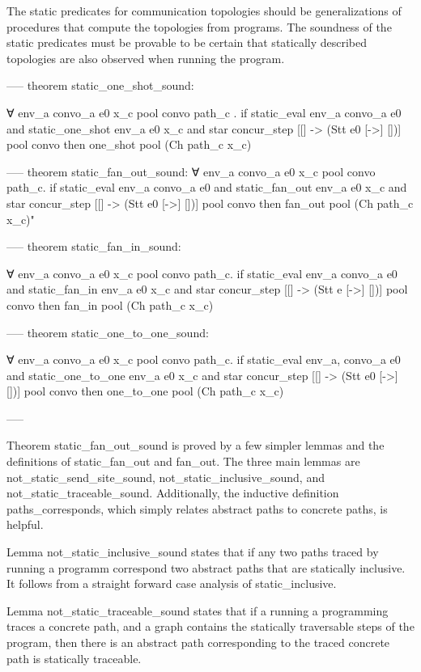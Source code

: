 The static predicates for communication topologies should be generalizations of procedures that
compute the topologies from programs.  The soundness of the static predicates must be provable
to be certain that statically described topologies are also observed when running the program.

-----
theorem static_one_shot_sound: 

∀ env_a convo_a e0 x_c pool convo path_c .
if
  static_eval env_a convo_a e0 and 
  static_one_shot env_a e0 x_c and 
  star concur_step [[] -> (Stt e0 [->] [])] {} pool convo
then
  one_shot pool (Ch path_c x_c)

-----
theorem static_fan_out_sound:
∀ env_a convo_a e0 x_c pool convo path_c. 
  if 
    static_eval env_a convo_a e0 and 
    static_fan_out env_a e0 x_c and 
    star concur_step [[] -> (Stt e0 [->] [])] {} pool convo
  then
    fan_out pool (Ch path_c x_c)" 

-----
theorem static_fan_in_sound:

∀ env_a convo_a e0 x_c pool convo path_c. 
  if
    static_eval env_a convo_a e0 and 
    static_fan_in env_a e0 x_c and 
    star concur_step [[] -> (Stt e [->] [])] {} pool convo
  then
    fan_in pool (Ch path_c x_c)

-----
theorem static_one_to_one_sound:

∀ env_a convo_a e0 x_c pool convo path_c. 
  if
    static_eval env_a, convo_a e0 and 
    static_one_to_one env_a e0 x_c and
    star concur_step [[] -> (Stt e0 [->] [])] {} pool convo
  then
    one_to_one pool (Ch path_c x_c)

-----

Theorem static_fan_out_sound is proved by a few simpler lemmas and the definitions
of static_fan_out and fan_out.  The three main lemmas are not_static_send_site_sound,
not_static_inclusive_sound, and not_static_traceable_sound.  Additionally, the inductive
definition paths_corresponds, which simply relates abstract paths to concrete paths,
is helpful. 

Lemma not_static_inclusive_sound states that if any two paths traced by running a programm
correspond two abstract paths that are statically inclusive.  It follows from a straight
forward case analysis of static_inclusive.

Lemma not_static_traceable_sound states that if a running a programming traces a concrete
path, and a graph contains the statically traversable steps of the program, then there is an
abstract path corresponding to the traced concrete path is statically traceable.   

